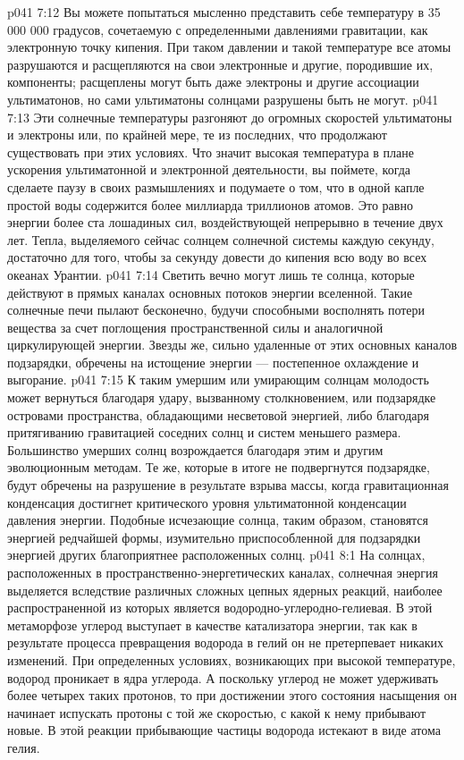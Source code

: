\vs p041 7:12 \pc Вы можете попытаться мысленно представить себе температуру в 35 000 000 градусов, сочетаемую с определенными давлениями гравитации, как электронную точку кипения. При таком давлении и такой температуре все атомы разрушаются и расщепляются на свои электронные и другие, породившие их, компоненты; расщеплены могут быть даже электроны и другие ассоциации ультиматонов, но сами ультиматоны солнцами разрушены быть не могут.
\vs p041 7:13 Эти солнечные температуры разгоняют до огромных скоростей ультиматоны и электроны или, по крайней мере, те из последних, что продолжают существовать при этих условиях. Что значит высокая температура в плане ускорения ультиматонной и электронной деятельности, вы поймете, когда сделаете паузу в своих размышлениях и подумаете о том, что в одной капле простой воды содержится более миллиарда триллионов атомов. Это равно энергии более ста лошадиных сил, воздействующей непрерывно в течение двух лет. Тепла, выделяемого сейчас солнцем солнечной системы каждую секунду, достаточно для того, чтобы за секунду довести до кипения всю воду во всех океанах Урантии.
\vs p041 7:14 \pc Светить вечно могут лишь те солнца, которые действуют в прямых каналах основных потоков энергии вселенной. Такие солнечные печи пылают бесконечно, будучи способными восполнять потери вещества за счет поглощения пространственной силы и аналогичной циркулирующей энергии. Звезды же, сильно удаленные от этих основных каналов подзарядки, обречены на истощение энергии --- постепенное охлаждение и выгорание.
\vs p041 7:15 К таким умершим или умирающим солнцам молодость может вернуться благодаря удару, вызванному столкновением, или подзарядке островами пространства, обладающими несветовой энергией, либо благодаря притягиванию гравитацией соседних солнц и систем меньшего размера. Большинство умерших солнц возрождается благодаря этим и другим эволюционным методам. Те же, которые в итоге не подвергнутся подзарядке, будут обречены на разрушение в результате взрыва массы, когда гравитационная конденсация достигнет критического уровня ультиматонной конденсации давления энергии. Подобные исчезающие солнца, таким образом, становятся энергией редчайшей формы, изумительно приспособленной для подзарядки энергией других благоприятнее расположенных солнц.
\vs p041 8:1 На солнцах, расположенных в пространственно\hyp{}энергетических каналах, солнечная энергия выделяется вследствие различных сложных цепных ядерных реакций, наиболее распространенной из которых является водородно\hyp{}углеродно\hyp{}гелиевая. В этой метаморфозе углерод выступает в качестве катализатора энергии, так как в результате процесса превращения водорода в гелий он не претерпевает никаких изменений. При определенных условиях, возникающих при высокой температуре, водород проникает в ядра углерода. А поскольку углерод не может удерживать более четырех таких протонов, то при достижении этого состояния насыщения он начинает испускать протоны с той же скоростью, с какой к нему прибывают новые. В этой реакции прибывающие частицы водорода истекают в виде атома гелия.
